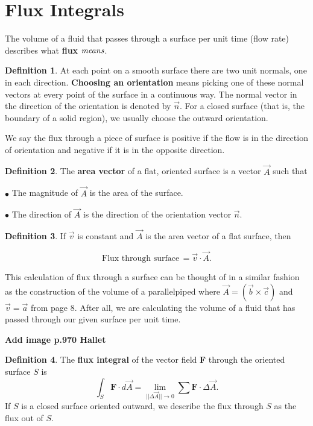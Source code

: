 \documentclass[12pt, a4paper]{article}
\theoremstyle{plain}
\theoremstyle{definition}
\newtheorem{definition}{Definition}[section]
\theoremstyle{remark}
\begin{document}
\newpage
\part{Flux Integrals}


The volume of a fluid that passes through a surface per unit time (flow rate) describes what \textbf{flux} $\it{means}$. 

\begin{definition}
At each point on a smooth surface there are two unit normals, one in each direction. \textbf{Choosing an orientation} means picking one of these normal vectors at every point of the surface in a continuous way. 
The normal vector in the direction of the orientation is denoted by $\vec{n}$. For a closed surface (that is, the boundary of a solid region), we usually choose the outward orientation. 
\end{definition}

We say the flux through a piece of surface is positive if the flow is in the direction of orientation and negative if it is in the opposite direction.

\begin{definition}
The \textbf{area vector} of a flat, oriented surface is a vector $\vec{A}$ such that 

$\bullet$ The magnitude of $\vec{A}$ is the area of the surface.

$\bullet$ The direction of $\vec{A}$ is the direction of the orientation vector $\vec{n}$.
\end{definition}

\begin{definition}
If $\vec{v}$ is constant and $\vec{A}$ is the area vector of a flat surface, then 

$$\text{Flux through surface} \, = \vec{v} \cdot \vec{A}.$$
\end{definition}

This calculation of flux through a surface can be thought of in a similar fashion as the construction of the volume of a parallelpiped where $\vec{A} = (\vec{b} \times \vec{c})$ and $\vec{v} = \vec{a}$ from page 8. After all, we are calculating the volume of a fluid that has passed through our given surface per unit time. 


\textbf{Add image p.970 Hallet}

\begin{definition}
The \textbf{flux integral} of the vector field \textbf{F} through the oriented surface $S$ is 
$$ \int_S \textbf{F} \cdot d \vec{A} = \lim_{||\Delta \vec{A}|| \to 0} \sum \textbf{F} \cdot \Delta \vec{A}.$$
If $S$ is a closed surface oriented outward, we describe the flux through $S$ as the flux out of $S$.
\end{definition}
\end{document}
